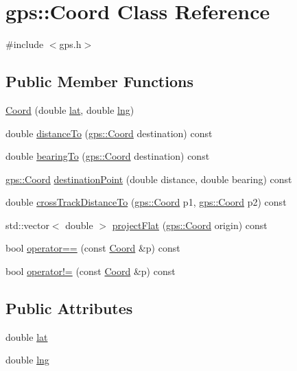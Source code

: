\hypertarget{classgps_1_1Coord}{}\section{gps\+:\+:Coord Class Reference}
\label{classgps_1_1Coord}


{\ttfamily \#include $<$gps.\+h$>$}

\subsection*{Public Member Functions}
\begin{DoxyCompactItemize}
\item 
\hyperlink{classgps_1_1Coord_afcc45fae837b48cd7d9bd545c4dc574c}{Coord} (double \hyperlink{classgps_1_1Coord_a17cbbd7580a83c42f650b8f93e14d98e}{lat}, double \hyperlink{classgps_1_1Coord_abca98aaabe2dc3cf50ebdd687c2f47e8}{lng})
\item 
double \hyperlink{classgps_1_1Coord_a24d3b9899dc262a40728f7e343781ab6}{distance\+To} (\hyperlink{classgps_1_1Coord}{gps\+::\+Coord} destination) const
\item 
double \hyperlink{classgps_1_1Coord_a304e6cb56296d8d945310d7b931fca4e}{bearing\+To} (\hyperlink{classgps_1_1Coord}{gps\+::\+Coord} destination) const
\item 
\hyperlink{classgps_1_1Coord}{gps\+::\+Coord} \hyperlink{classgps_1_1Coord_a774fc85267d9cd3d01d151e784f1112c}{destination\+Point} (double distance, double bearing) const
\item 
double \hyperlink{classgps_1_1Coord_a2d421b8235201290c2a7c5d13eba097e}{cross\+Track\+Distance\+To} (\hyperlink{classgps_1_1Coord}{gps\+::\+Coord} p1, \hyperlink{classgps_1_1Coord}{gps\+::\+Coord} p2) const
\item 
std\+::vector$<$ double $>$ \hyperlink{classgps_1_1Coord_a43b8263439170e923db7b21a32b653f8}{project\+Flat} (\hyperlink{classgps_1_1Coord}{gps\+::\+Coord} origin) const
\item 
bool \hyperlink{classgps_1_1Coord_a254245e5cdfbac96a1c6e0332f2d65fb}{operator==} (const \hyperlink{classgps_1_1Coord}{Coord} \&p) const
\item 
bool \hyperlink{classgps_1_1Coord_ad832b140a8a39355874e268834d078cd}{operator!=} (const \hyperlink{classgps_1_1Coord}{Coord} \&p) const
\end{DoxyCompactItemize}
\subsection*{Public Attributes}
\begin{DoxyCompactItemize}
\item 
double \hyperlink{classgps_1_1Coord_a17cbbd7580a83c42f650b8f93e14d98e}{lat}
\item 
double \hyperlink{classgps_1_1Coord_abca98aaabe2dc3cf50ebdd687c2f47e8}{lng}
\end{DoxyCompactItemize}


